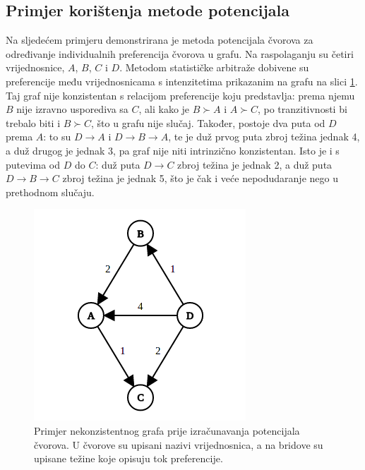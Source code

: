 \documentclass[lmodern, utf8, diplomski, numeric]{fer}
\begin{document}
  \subsection{Primjer korištenja metode potencijala}
  Na sljedećem primjeru demonstrirana je metoda potencijala čvorova za određivanje individualnih preferencija čvorova u grafu.
  Na raspolaganju su četiri vrijednosnice, $A$, $B$, $C$ i $D$.
  Metodom statističke arbitraže dobivene su preferencije među vrijednosnicama s intenzitetima prikazanim na grafu na slici \ref{fig:graph-eg-1}.
  Taj graf nije konzistentan s relacijom preferencije koju predstavlja: prema njemu $B$ nije izravno usporediva sa $C$, ali kako je $B \succ A$ i $A \succ C$, po tranzitivnosti bi trebalo biti i $B \succ C$, što u grafu nije slučaj.
  Također, postoje dva puta od $D$ prema $A$: to su $D \rightarrow A$ i $D \rightarrow B \rightarrow A$, te je duž prvog puta zbroj težina jednak 4, a duž drugog je jednak 3, pa graf nije niti intrinzično konzistentan.
  Isto je i s putevima od $D$ do $C$: duž puta $D \rightarrow C$ zbroj težina je jednak 2, a duž puta $D \rightarrow B \rightarrow C$ zbroj težina je jednak 5, što je čak i veće nepodudaranje nego u prethodnom slučaju.
  \begin{figure}[h]
    \centering
    \includegraphics[width=0.5\linewidth]{graphics/graph-eg-1.png}
    \caption{Primjer nekonzistentnog grafa prije izračunavanja potencijala čvorova.
    U čvorove su upisani nazivi vrijednosnica, a na bridove su upisane težine koje opisuju tok preferencije.}
    \label{fig:graph-eg-1}
  \end{figure}
\end{document}
